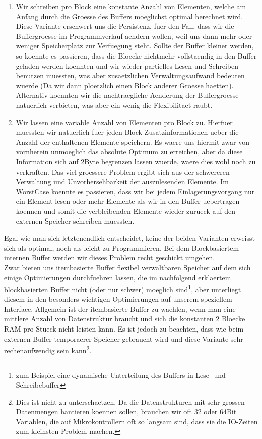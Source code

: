 \documentclass[10pt,a4paper]{article}
\begin{document}
\begin{enumerate}
\item Wir schreiben pro Block eine konstante Anzahl von Elementen, welche am Anfang durch die Groesse des Buffers moeglichst optimal berechnet wird. Diese Variante erschwert uns die Persistenz, fuer den Fall, dass wir die Buffergroesse im Programmverlauf aendern wollen, weil uns dann mehr oder weniger Speicherplatz zur Verfuegung steht. Sollte der Buffer kleiner  werden, so koennte es passieren, dass die Bloecke nichtmehr vollstaendig in den Buffer geladen werden koennten und wir wieder partielles Lesen und Schreiben benutzen muessten, was aber zusaetzlichen Verwaltungsaufwand bedeuten wuerde (Da wir dann ploetzlich einen Block anderer Groesse haetten). Alternativ koennten wir die nachtraegliche Aenderung der Buffergroesse natuerlich verbieten, was aber ein wenig die Flexibilitaet raubt.
\item Wir lassen eine variable Anzahl von Elementen pro Block zu. Hierfuer muessten wir natuerlich fuer jeden Block Zusatzinformationen ueber die Anzahl der enthaltenen Elemente speichern. Es waere uns hiermit zwar von vornherein unmoeglich das absolute Optimum zu erreichen, aber da diese Information sich auf 2Byte begrenzen lassen wuerde, waere dies wohl noch zu verkraften. Das viel groessere Problem ergibt sich aus der schwereren Verwaltung und Unvorhersehbarkeit der auszulesenden Elemente. Im WorstCase koennte es passieren, dass wir bei jedem Einlagerungsvorgang nur ein Element lesen oder mehr Elemente als wir in den Buffer uebertragen koennen und somit die verbleibenden Elemente wieder zurueck auf den externen Speicher schreiben muessten. 
\end{enumerate} 
Egal wie man sich letztenendlich entscheidet, keine der beiden Varianten erweisst sich als optimal, noch als leicht zu Programmieren. Bei dem Blockbasiertem internen Buffer werden wir dieses Problem recht geschickt umgehen.\\
Zwar bieten uns itembasierte Buffer flexibel verwaltbaren Speicher auf dem sich einige Optimierungen durchfuehren lassen, die im nachfolgend erklaertem blockbasierten Buffer nicht (oder nur schwer) moeglich sind\footnote{zum Beispiel eine dynamische Unterteilung des Buffers in Lese- und Schreibebuffer}, aber unterliegt diesem in den besonders wichtigen Optimierungen auf unserem speziellem Interface. Allgemein ist der itembasierte Buffer zu waehlen, wenn man eine mittlere Anzahl von Datenstruktur braucht und sich die konstanten 2 Bloecke RAM pro Stueck nicht leisten kann. Es ist jedoch zu beachten, dass wie beim externen Buffer temporaerer Speicher gebraucht wird und diese Variante sehr rechenaufwendig sein kann\footnote{Dies ist nicht zu unterschaetzen. Da die Datenstrukturen mit sehr grossen Datenmengen hantieren koennen sollen, brauchen wir oft 32 oder 64Bit Variablen, die auf Mikrokontrollern oft so langsam sind, dass sie die IO-Zeiten zum kleinsten Problem machen.}.
\end{document}
